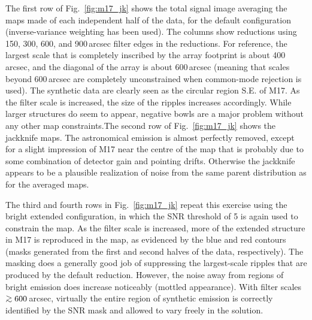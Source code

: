 \documentclass[useAMS,usenatbib,nofootinbib]{mn2e}
\def\gsim{\mathrel{\lower2.5pt\vbox{\lineskip=0pt\baselineskip=0pt
          \hbox{$>$}\hbox{$\sim$}}}}
\begin{document}
The first row of Fig.~\ref{fig:m17_jk} shows the total signal image
averaging the maps made of each independent half of the data, for the
default configuration (inverse-variance weighting has been used). The
columns show reductions using 150, 300, 600, and 900\,arcsec filter
edges in the reductions. For reference, the largest scale that is
completely inscribed by the array footprint is about 400\,arcsec, and
the diagonal of the array is about 600\,arcsec (meaning that scales
beyond 600\,arcsec are completely unconstrained when common-mode
rejection is used).  The synthetic data are clearly seen as the
circular region S.E. of M17. As the filter scale is increased, the
size of the ripples increases accordingly. While larger structures do
seem to appear, negative bowls are a major problem without any other
map constraints.The second row of Fig.~\ref{fig:m17_jk} shows the
jackknife maps. The astronomical emission is almost perfectly removed,
except for a slight impression of M17 near the centre of the map that
is probably due to some combination of detector gain and pointing
drifts. Otherwise the jackknife appears to be a plausible realization
of noise from the same parent distribution as for the averaged maps.

The third and fourth rows in Fig.~\ref{fig:m17_jk} repeat this
exercise using the bright extended configuration, in which the SNR
threshold of 5 is again used to constrain the map. As the filter scale
is increased, more of the extended structure in M17 is reproduced in
the map, as evidenced by the blue and red contours (masks generated
from the first and second halves of the data, respectively). The
masking does a generally good job of suppressing the largest-scale
ripples that are produced by the default reduction. However, the noise
away from regions of bright emission does increase noticeably (mottled
appearance). With filter scales $\gsim600$\,arcsec, virtually the
entire region of synthetic emission is correctly identified by the SNR
mask and allowed to vary freely in the solution.
\end{document}
